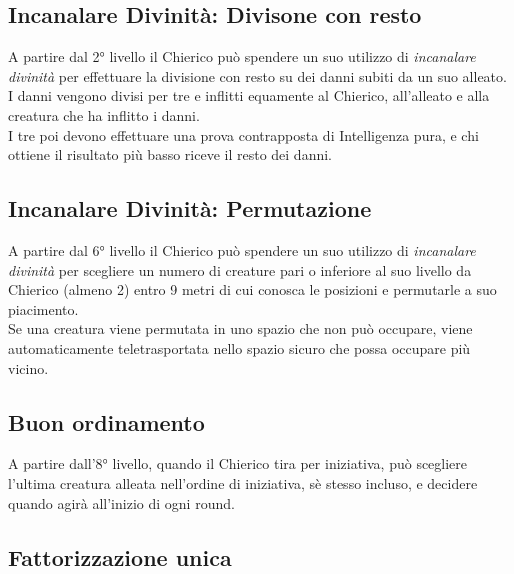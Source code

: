 \subsection{Incanalare Divinità: Divisone con resto}

A partire dal 2° livello il Chierico può spendere un suo utilizzo di \textit{incanalare divinità} per effettuare la divisione con resto su dei danni subiti da un suo alleato. \\ I danni vengono divisi per tre e inflitti equamente al Chierico, all'alleato e alla creatura che ha inflitto i danni. \\ I tre poi devono effettuare una prova contrapposta di Intelligenza pura, e chi ottiene il risultato più basso riceve il resto dei danni.

\subsection{Incanalare Divinità: Permutazione}

A partire dal 6° livello il Chierico può spendere un suo utilizzo di \textit{incanalare divinità} per scegliere un numero di creature pari o inferiore al suo livello da Chierico (almeno 2) entro 9 metri di cui conosca le posizioni e permutarle a suo piacimento. \\ Se una creatura viene permutata in uno spazio che non può occupare, viene automaticamente teletrasportata nello spazio sicuro che possa occupare più vicino.

\subsection{Buon ordinamento}

A partire dall'8° livello, quando il Chierico tira per iniziativa, può scegliere l'ultima creatura alleata nell'ordine di iniziativa, sè stesso incluso, e decidere quando agirà all'inizio di ogni round.

\subsection{Fattorizzazione unica}

